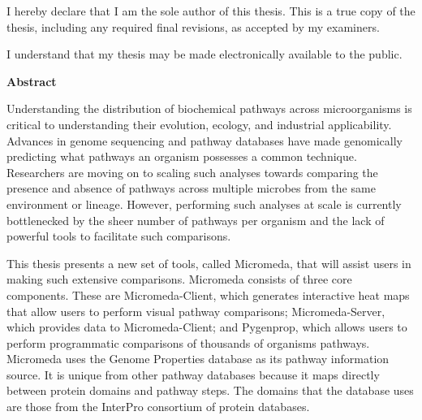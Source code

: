 \cleardoublepage %

  \noindent
I hereby declare that I am the sole author of this thesis. This is a true copy of the thesis, including any required final revisions, as accepted by my examiners.

  \bigskip
  
  \noindent
I understand that my thesis may be made electronically available to the public.

\cleardoublepage


\begin{center}\textbf{Abstract}\end{center}

Understanding the distribution of biochemical pathways across microorganisms is critical to understanding their evolution, ecology, and industrial applicability. Advances in genome sequencing and pathway databases have made genomically predicting what pathways an organism possesses a common technique. Researchers are moving on to scaling such analyses towards comparing the presence and absence of pathways across multiple microbes from the same environment or lineage. However, performing such analyses at scale is currently bottlenecked by the sheer number of pathways per organism and the lack of powerful tools to facilitate such comparisons. 

This thesis presents a new set of tools, called Micromeda, that will assist users in making such extensive comparisons. Micromeda consists of three core components. These are Micromeda-Client, which generates interactive heat maps that allow users to perform visual pathway comparisons; Micromeda-Server, which provides data to Micromeda-Client; and Pygenprop, which allows users to perform programmatic comparisons of thousands of organisms pathways. Micromeda uses the Genome Properties database as its pathway information source. It is unique from other pathway databases because it maps directly between protein domains and pathway steps. The domains that the database uses are those from the InterPro consortium of protein databases. 

